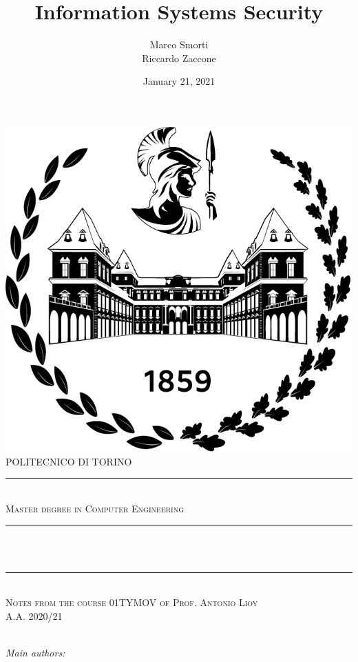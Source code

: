 \documentclass[11pt]{report}
\title{Information Systems Security}				        %
\author{Marco Smorti \\ Riccardo Zaccone}   %
\date{January 21, 2021}								    %
\makeatletter
\let\thetitle\@title
\let\theauthor\@author
\makeatother
\begin{document}

\begin{titlepage}
	\centering
	\includegraphics[scale=0.6]{logoPoli.png}\\[1.0 cm]				
	\textsc{\LARGE POLITECNICO DI TORINO}\\[-0.2 cm]		%
	\rule{\linewidth}{0.2 mm} \\
	\textsc{\large Master degree in Computer Engineering}\\[1.0 cm]		
	\rule{\linewidth}{0.2 mm} \\[0.4 cm]
	{ \huge \bfseries \thetitle}\\
	\rule{\linewidth}{0.2 mm} \\%
	\textsc{\Large Notes from the course 01TYMOV of Prof. Antonio Lioy \\ A.A. 2020/21}\\[0 cm]	
	\textsc{}\\[0.4 cm]
	
	\begin{minipage}{0.4\textwidth}
		\begin{flushleft} \large
			\emph{Main authors:}\\
			\theauthor
			\end{flushleft}
			\end{minipage}~
			\begin{minipage}{0.4\textwidth}
			\begin{flushright} \large
		\end{flushright}
	\end{minipage}\\[1.0 cm]




\end{titlepage}
\end{document}

